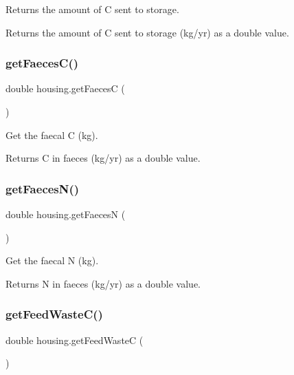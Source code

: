Returns the amount of C sent to storage. 

\begin{DoxyReturn}{Returns}
the amount of C sent to storage (kg/yr) as a double value. 
\end{DoxyReturn}
\mbox{\label{classhousing_ac3deab93a70d3d7c05439aee7f1bcc2e}} 
\subsubsection{\texorpdfstring{getFaecesC()}{getFaecesC()}}
{\footnotesize\ttfamily double housing.\+get\+FaecesC (\begin{DoxyParamCaption}{ }\end{DoxyParamCaption})\hspace{0.3cm}{\ttfamily [inline]}}



Get the faecal C (kg). 

\begin{DoxyReturn}{Returns}
C in faeces (kg/yr) as a double value. 
\end{DoxyReturn}
\mbox{\label{classhousing_ae77b6199b98972e871a376aaeaf59bcd}} 
\subsubsection{\texorpdfstring{getFaecesN()}{getFaecesN()}}
{\footnotesize\ttfamily double housing.\+get\+FaecesN (\begin{DoxyParamCaption}{ }\end{DoxyParamCaption})\hspace{0.3cm}{\ttfamily [inline]}}



Get the faecal N (kg). 

\begin{DoxyReturn}{Returns}
N in faeces (kg/yr) as a double value. 
\end{DoxyReturn}
\mbox{\label{classhousing_a2ebee76702a20e253334752f00b0af8d}} 
\subsubsection{\texorpdfstring{getFeedWasteC()}{getFeedWasteC()}}
{\footnotesize\ttfamily double housing.\+get\+Feed\+WasteC (\begin{DoxyParamCaption}{ }\end{DoxyParamCaption})\hspace{0.3cm}{\ttfamily [inline]}}



